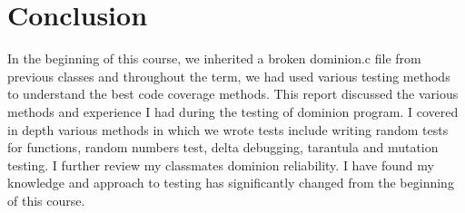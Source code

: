 \documentclass[titlepage]{article}
\begin{document}
\section{Conclusion}
\begin{singlespace}
	In the beginning of this course, we inherited a broken dominion.c file from previous classes and throughout the term, we had used various testing methods to understand the best code coverage methods. This report discussed the various methods and experience I had during the testing of dominion program. I covered in depth various methods in which we wrote tests include writing random tests for functions, random numbers test, delta debugging, tarantula and mutation testing. I further review my classmates dominion reliability. I have found my knowledge and approach to testing has significantly changed from the beginning of this course. 
\end{singlespace}
\end{document}
